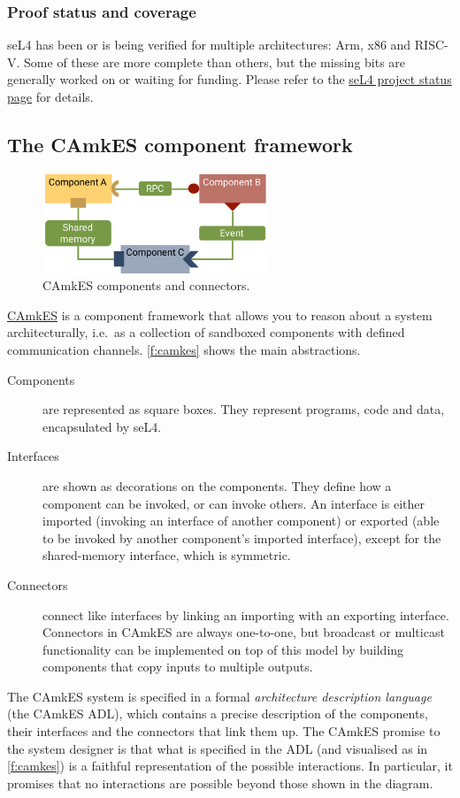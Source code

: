 \documentclass[english,a4paper,12pt\ifDraft,draft\fi]{report}
\newcommand{\SSect}[1]{\subsection{#1}}
\newcommand{\SSSect}[1]{\subsubsection*{#1}}
\newcommand{\SSect}[1]{\section{#1}}
\newcommand{\SSSect}[1]{\subsection*{#1}}
\providecommand{\href}[2]{\url{#2}}
\begin{document}
  \SSSect{Proof status and coverage}

  seL4 has been or is being verified for multiple architectures: Arm,
  x86 and RISC-V. Some of these are more complete than others, but the
  missing bits are generally worked on or waiting for funding. Please
  refer to the
  \href{https://docs.sel4.systems/projects/sel4/status.html}{seL4
    project status page} for details.

  \SSect{The CAmkES component framework}\label{s:camkes}

  \begin{figure}[b]
    \centering
    \includegraphics[width=0.6\textwidth]{camkes}
    \caption{CAmkES components and connectors.}
    \label{f:camkes}
  \end{figure}

  \href{https://trustworthy.systems/projects/TS/camkes/trustcomp.pml}{CAmkES}
  is a component framework that allows you to reason about a
  system architecturally, i.e.\ as a collection of sandboxed
  components with defined communication channels. \autoref{f:camkes}
  shows the main abstractions.
  \begin{description}
  \item[Components] are represented as square boxes. They represent
     programs, code and data, encapsulated by seL4.
  \item[Interfaces] are shown as decorations on the components. They
    define how a component can be invoked, or can invoke others. An
    interface is either imported (invoking an interface of another
    component) or exported (able to be invoked by another component's
    imported interface), except for the shared-memory interface, which
    is symmetric.
  \item[Connectors] connect like interfaces by linking an importing with an
    exporting interface. Connectors in CAmkES are always one-to-one,
    but broadcast or multicast functionality can be implemented on top
    of this model by building components that copy inputs to multiple outputs.
  \end{description}

  The CAmkES system is specified in a formal \emph{architecture
    description language} (the CAmkES ADL), which contains a precise
  description of the components, their interfaces and the connectors
  that link them up. The CAmkES promise to the system designer is
  that what is specified in the ADL (and visualised as in
  \autoref{f:camkes}) is a faithful representation of the possible
  interactions. In particular, it promises that no interactions are
  possible beyond those shown in the diagram.
\end{document}
